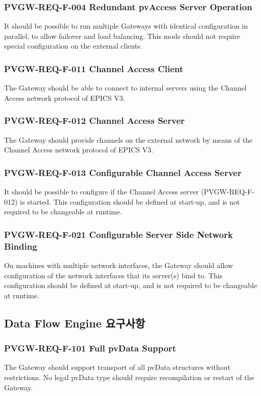 \documentclass[11pt
  , a4paper
  , article
  , oneside
]{memoir}
\begin{document}
\subsubsection{PVGW-REQ-F-004 Redundant pvAccess Server Operation}
It should be possible to run multiple Gateways with identical configuration in parallel, to allow failover and load balancing. This mode should not require special configuration on the external clients.

\subsubsection{PVGW-REQ-F-011 Channel Access Client}
The Gateway should be able to connect to internal servers using the Channel Access network protocol of EPICS V3.

\subsubsection{PVGW-REQ-F-012 Channel Access Server}
The Gateway should provide channels on the external network by means of the Channel Access network protocol of EPICS V3.

\subsubsection{PVGW-REQ-F-013 Configurable Channel Access Server}
It should be possible to configure if the Channel Access server (PVGW-REQ-F-012) is started. This configuration should be defined at start-up, and is not required to be changeable at runtime.

\subsubsection{PVGW-REQ-F-021 Configurable Server Side Network Binding}
On machines with multiple network interfaces, the Gateway should allow configuration of the network interfaces that its server(s) bind to. This configuration should be defined at start-up, and is not required to be changeable at runtime.


\subsection{Data Flow Engine 요구사항}
\subsubsection{PVGW-REQ-F-101 Full pvData Support}
The Gateway should support transport of all pvData structures without restrictions. No legal pvData type should require recompilation or restart of the Gateway.
\end{document}
